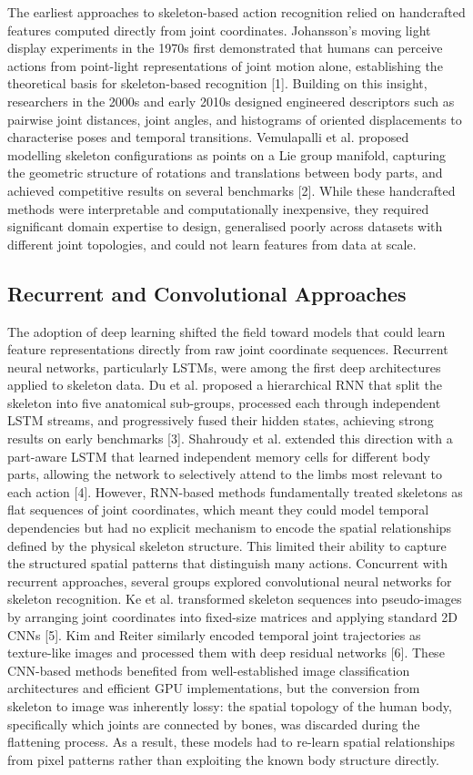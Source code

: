 The earliest approaches to skeleton-based action recognition relied on handcrafted features computed directly from joint coordinates. Johansson's moving light display experiments in the 1970s first demonstrated that humans can perceive actions from point-light representations of joint motion alone, establishing the theoretical basis for skeleton-based recognition [1]. Building on this insight, researchers in the 2000s and early 2010s designed engineered descriptors such as pairwise joint distances, joint angles, and histograms of oriented displacements to characterise poses and temporal transitions. Vemulapalli et al. proposed modelling skeleton configurations as points on a Lie group manifold, capturing the geometric structure of rotations and translations between body parts, and achieved competitive results on several benchmarks [2]. While these handcrafted methods were interpretable and computationally inexpensive, they required significant domain expertise to design, generalised poorly across datasets with different joint topologies, and could not learn features from data at scale.
\subsection{Recurrent and Convolutional Approaches}
The adoption of deep learning shifted the field toward models that could learn feature representations directly from raw joint coordinate sequences. Recurrent neural networks, particularly LSTMs, were among the first deep architectures applied to skeleton data. Du et al. proposed a hierarchical RNN that split the skeleton into five anatomical sub-groups, processed each through independent LSTM streams, and progressively fused their hidden states, achieving strong results on early benchmarks [3]. Shahroudy et al. extended this direction with a part-aware LSTM that learned independent memory cells for different body parts, allowing the network to selectively attend to the limbs most relevant to each action [4]. However, RNN-based methods fundamentally treated skeletons as flat sequences of joint coordinates, which meant they could model temporal dependencies but had no explicit mechanism to encode the spatial relationships defined by the physical skeleton structure. This limited their ability to capture the structured spatial patterns that distinguish many actions.
Concurrent with recurrent approaches, several groups explored convolutional neural networks for skeleton recognition. Ke et al. transformed skeleton sequences into pseudo-images by arranging joint coordinates into fixed-size matrices and applying standard 2D CNNs [5]. Kim and Reiter similarly encoded temporal joint trajectories as texture-like images and processed them with deep residual networks [6]. These CNN-based methods benefited from well-established image classification architectures and efficient GPU implementations, but the conversion from skeleton to image was inherently lossy: the spatial topology of the human body, specifically which joints are connected by bones, was discarded during the flattening process. As a result, these models had to re-learn spatial relationships from pixel patterns rather than exploiting the known body structure directly.

